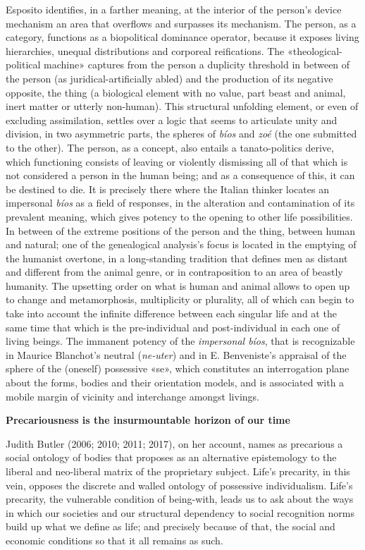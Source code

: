 \documentclass[a4paper,]{scrartcl}
\begin{document}
Esposito identifies, in a farther meaning, at the interior of the
person's device mechanism an area that overflows and surpasses its
mechanism. The person, as a category, functions as a biopolitical
dominance operator, because it exposes living hierarchies, unequal
distributions and corporeal reifications. The «theological-political
machine» captures from the person a duplicity threshold in between of
the person (as juridical-artificially abled) and the production of its
negative opposite, the thing (a biological element with no value, part
beast and animal, inert matter or utterly non-human). This structural
unfolding element, or even of excluding assimilation, settles over a
logic that seems to articulate unity and division, in two asymmetric
parts, the spheres of \emph{bíos} and \emph{zoé} (the one submitted to
the other). The person, as a concept, also entails a tanato-politics
derive, which functioning consists of leaving or violently dismissing
all of that which is not considered a person in the human being; and as
a consequence of this, it can be destined to die. It is precisely there
where the Italian thinker locates an impersonal \emph{bíos} as a field
of responses, in the alteration and contamination of its prevalent
meaning, which gives potency to the opening to other life possibilities.
In between of the extreme positions of the person and the thing, between
human and natural; one of the genealogical analysis's focus is located
in the emptying of the humanist overtone, in a long-standing tradition
that defines men as distant and different from the animal genre, or in
contraposition to an area of beastly humanity. The upsetting order on
what is human and animal allows to open up to change and metamorphosis,
multiplicity or plurality, all of which can begin to take into account
the infinite difference between each singular life and at the same time
that which is the pre-individual and post-individual in each one of
living beings. The immanent potency of the \emph{impersonal bíos}, that
is recognizable in Maurice Blanchot's neutral (\emph{ne-uter}) and in E.
Benveniste's appraisal of the sphere of the (oneself) possessive «se»,
which constitutes an interrogation plane about the forms, bodies and
their orientation models, and is associated with a mobile margin of
vicinity and interchange amongst livings.

\textbf{Precariousness is the insurmountable horizon of our time}

Judith Butler (2006; 2010; 2011; 2017), on her account, names as
precarious a social ontology of bodies that proposes as an alternative
epistemology to the liberal and neo-liberal matrix of the proprietary
subject. Life's precarity, in this vein, opposes the discrete and walled
ontology of possessive individualism. Life's precarity, the vulnerable
condition of being-with, leads us to ask about the ways in which our
societies and our structural dependency to social recognition norms
build up what we define as life; and precisely because of that, the
social and economic conditions so that it all remains as such.
\end{document}
